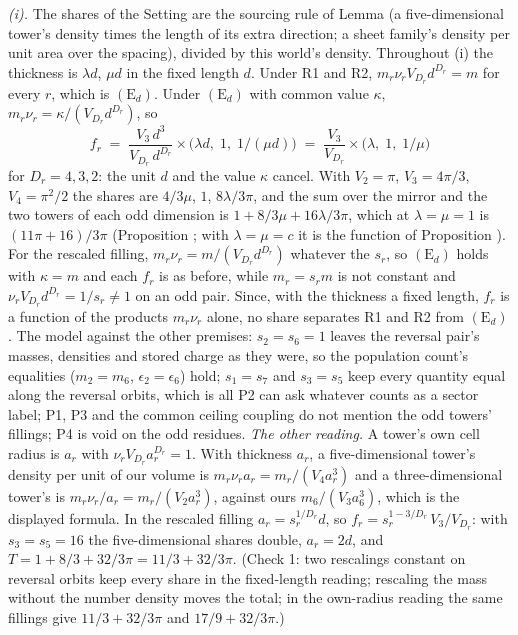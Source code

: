 \emph{(i).} The shares of the Setting are the sourcing rule of Lemma  (a five-dimensional tower's density times the length of its extra direction; a sheet family's density per unit area over the spacing), divided by this world's density. Throughout (i) the thickness is $\lambda d$, $\mu d$ in the fixed length $d$. Under R1 and R2, $m_{r}\nu_{r}V_{D_{r}}d^{D_{r}} = m$ for every $r$, which is $(\mathrm{E}_{d})$. Under $(\mathrm{E}_{d})$ with common value $\kappa$, $m_{r}\nu_{r} = \kappa/(V_{D_{r}}d^{D_{r}})$, so
\[
f_{r} \;=\; \frac{V_{3}\,d^{3}}{V_{D_{r}}\,d^{D_{r}}} \times \bigl(\lambda d,\; 1,\; 1/(\mu d)\bigr)
\;=\; \frac{V_{3}}{V_{D_{r}}} \times \bigl(\lambda,\; 1,\; 1/\mu\bigr)
\]
for $D_{r} = 4, 3, 2$: the unit $d$ and the value $\kappa$ cancel. With $V_{2} = \pi$, $V_{3} = 4\pi/3$, $V_{4} = \pi^{2}/2$ the shares are $4/3\mu$, $1$, $8\lambda/3\pi$, and the sum over the mirror and the two towers of each odd dimension is $1 + 8/3\mu + 16\lambda/3\pi$, which at $\lambda = \mu = 1$ is $(11\pi + 16)/3\pi$ (Proposition ; with $\lambda = \mu = c$ it is the function of Proposition ). For the rescaled filling, $m_{r}\nu_{r} = m/(V_{D_{r}}d^{D_{r}})$ whatever the $s_{r}$, so $(\mathrm{E}_{d})$ holds with $\kappa = m$ and each $f_{r}$ is as before, while $m_{r} = s_{r}m$ is not constant and $\nu_{r}V_{D_{r}}d^{D_{r}} = 1/s_{r} \neq 1$ on an odd pair. Since, with the thickness a fixed length, $f_{r}$ is a function of the products $m_{r}\nu_{r}$ alone, no share separates R1 and R2 from $(\mathrm{E}_{d})$. The model against the other premises: $s_{2} = s_{6} = 1$ leaves the reversal pair's masses, densities and stored charge as they were, so the population count's equalities ($m_{2} = m_{6}$, $\epsilon_{2} = \epsilon_{6}$) hold; $s_{1} = s_{7}$ and $s_{3} = s_{5}$ keep every quantity equal along the reversal orbits, which is all P2 can ask whatever counts as a sector label; P1, P3 and the common ceiling coupling do not mention the odd towers' fillings; P4 is void on the odd residues. \emph{The other reading.} A tower's own cell radius is $a_{r}$ with $\nu_{r}V_{D_{r}}a_{r}^{D_{r}} = 1$. With thickness $a_{r}$, a five-dimensional tower's density per unit of our volume is $m_{r}\nu_{r}a_{r} = m_{r}/(V_{4}a_{r}^{3})$ and a three-dimensional tower's is $m_{r}\nu_{r}/a_{r} = m_{r}/(V_{2}a_{r}^{3})$, against ours $m_{6}/(V_{3}a_{6}^{3})$, which is the displayed formula. In the rescaled filling $a_{r} = s_{r}^{1/D_{r}}d$, so $f_{r} = s_{r}^{1 - 3/D_{r}}\,V_{3}/V_{D_{r}}$: with $s_{3} = s_{5} = 16$ the five-dimensional shares double, $a_{r} = 2d$, and $T = 1 + 8/3 + 32/3\pi = 11/3 + 32/3\pi$. (Check 1: two rescalings constant on reversal orbits keep every share in the fixed-length reading; rescaling the mass without the number density moves the total; in the own-radius reading the same fillings give $11/3 + 32/3\pi$ and $17/9 + 32/3\pi$.)

